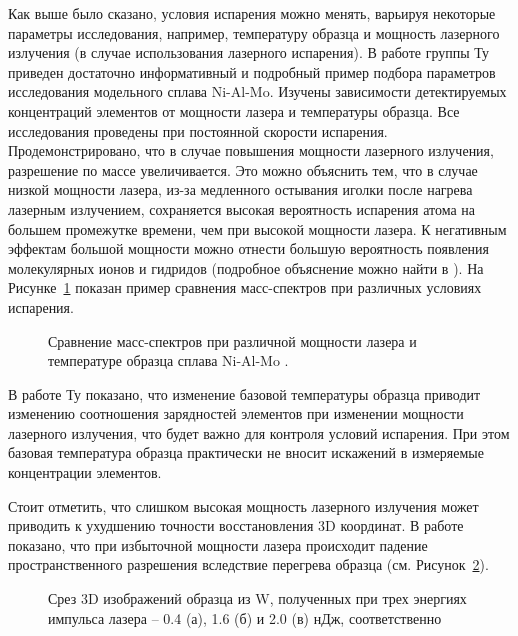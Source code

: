 Как выше было сказано, условия испарения можно менять, варьируя некоторые параметры исследования, например, температуру образца и мощность лазерного излучения (в случае использования лазерного испарения). В работе группы Ту \cite{Tu15} приведен достаточно информативный и подробный пример подбора параметров исследования модельного сплава Ni-Al-Mo. Изучены зависимости детектируемых концентраций элементов от мощности лазера и температуры образца. Все исследования проведены при постоянной скорости испарения. Продемонстрировано, что в случае повышения мощности лазерного излучения, разрешение по массе увеличивается. Это можно объяснить тем, что в случае низкой мощности лазера, из-за медленного остывания иголки после нагрева лазерным излучением, сохраняется высокая вероятность испарения атома на большем промежутке времени, чем при высокой мощности лазера. К негативным эффектам большой мощности можно отнести большую вероятность появления молекулярных ионов и гидридов (подробное объяснение можно найти в \cite{GaultBOOK}). На Рисунке~\cref{fig:ParamsPower} показан пример сравнения масс-спектров при различных условиях испарения.

\begin{figure}[htb]
	\caption{Сравнение масс-спектров при различной мощности лазера и температуре образца сплава Ni-Al-Mo \cite{Tu15}.}
	\label{fig:ParamsPower}
\end{figure}

В работе Ту \cite{Tu15} показано, что изменение базовой температуры образца приводит изменению соотношения зарядностей элементов при изменении мощности лазерного излучения, что будет важно для контроля условий испарения. При этом базовая температура образца практически не вносит искажений в измеряемые концентрации элементов.

Стоит отметить, что слишком высокая мощность лазерного излучения может приводить к ухудшению точности восстановления 3D координат. В работе \cite{Cerezo07} показано, что при избыточной мощности лазера происходит падение пространственного разрешения вследствие перегрева образца (см. Рисунок~\cref{fig:ParamsEnergy}).

\begin{figure}[htb]
	\caption{Срез 3D изображений образца из W, полученных при трех энергиях импульса лазера – 0.4 (а), 1.6 (б) и 2.0 (в) нДж, соответственно~\cite{Cerezo07}}
	\label{fig:ParamsEnergy}
\end{figure}

